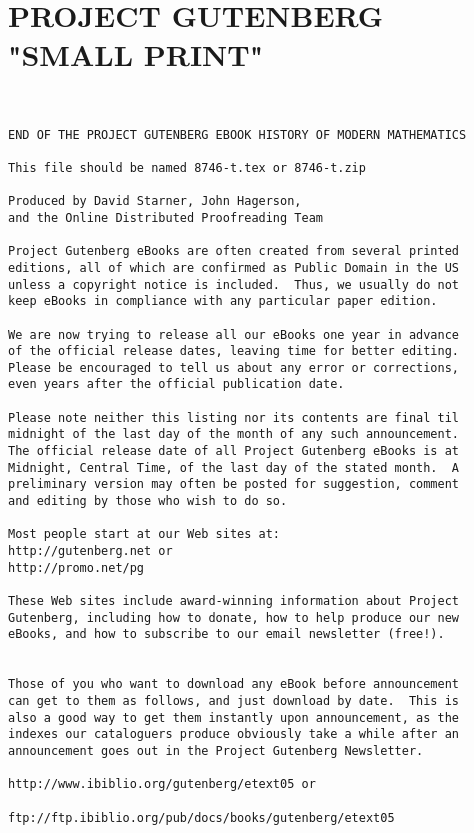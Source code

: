 \documentclass[oneside]{book}
\begin{document}
\newpage



\chapter{PROJECT GUTENBERG "SMALL PRINT"}
\small
{}
\begin{verbatim}


END OF THE PROJECT GUTENBERG EBOOK HISTORY OF MODERN MATHEMATICS

This file should be named 8746-t.tex or 8746-t.zip

Produced by David Starner, John Hagerson,
and the Online Distributed Proofreading Team

Project Gutenberg eBooks are often created from several printed
editions, all of which are confirmed as Public Domain in the US
unless a copyright notice is included.  Thus, we usually do not
keep eBooks in compliance with any particular paper edition.

We are now trying to release all our eBooks one year in advance
of the official release dates, leaving time for better editing.
Please be encouraged to tell us about any error or corrections,
even years after the official publication date.

Please note neither this listing nor its contents are final til
midnight of the last day of the month of any such announcement.
The official release date of all Project Gutenberg eBooks is at
Midnight, Central Time, of the last day of the stated month.  A
preliminary version may often be posted for suggestion, comment
and editing by those who wish to do so.

Most people start at our Web sites at:
http://gutenberg.net or
http://promo.net/pg

These Web sites include award-winning information about Project
Gutenberg, including how to donate, how to help produce our new
eBooks, and how to subscribe to our email newsletter (free!).


Those of you who want to download any eBook before announcement
can get to them as follows, and just download by date.  This is
also a good way to get them instantly upon announcement, as the
indexes our cataloguers produce obviously take a while after an
announcement goes out in the Project Gutenberg Newsletter.

http://www.ibiblio.org/gutenberg/etext05 or

ftp://ftp.ibiblio.org/pub/docs/books/gutenberg/etext05


\end{verbatim}
\end{document}
